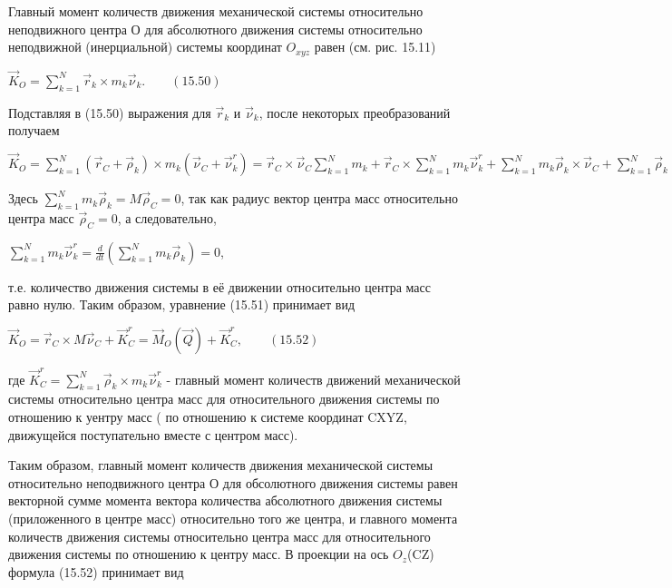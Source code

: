 {\begin{center}
	  \par Главный момент количеств движения механической системы относительно неподвижного центра О для абсолютного движения системы относительно неподвижной (инерциальной) системы координат $O_{xyz}$ равен (см. рис. 15.11)

	  \par $\vec K_O = \sum\limits_{k=1}^N \vec r_k \times m_k \vec\nu_k. \qquad (15.50)$

	  \par Подставляя в (15.50) выражения для $\vec r_k$ и $\vec\nu_k$, после некоторых преобразований получаем
	  
	  \par $\vec K_O = \sum\limits_{k=1}^N (\vec r_C + \vec\rho_k) \times m_k(\vec\nu_C + \vec\nu_k^r) = \vec r_C \times \vec\nu_C \sum\limits_{k=1}^N m_k + \vec r_C \times \sum\limits_{k=1}^N m_k \vec\nu_k^r + \sum\limits_{k=1}^N m_k \vec\rho_k \times \vec\nu_C + \sum\limits_{k=1}^N \vec\rho_k \times m_k \vec\nu_k^r. \qquad (15.51)$

	  \par Здесь $\sum\limits_{k=1}^N m_k \vec\rho_k = M \vec\rho_C = 0$, так как радиус вектор центра масс относительно центра масс $\vec\rho_C = 0$, а следовательно,

	  \par $\sum\limits_{k=1}^N m_k \vec\nu_k^r = \frac{d}{dt}(\sum\limits_{k=1}^N m_k \vec\rho_k) = 0$,

	  \par т.е. количество движения системы в её движении относительно центра масс равно нулю. Таким образом, уравнение (15.51) принимает вид

	  \par $\vec K_O = \vec r_C \times M \vec\nu_C + \vec K_C^r = \vec M_O(\vec Q) + \vec K_C^r, \qquad (15.52)$

	  \par где $\vec K_C^r = \sum\limits_{k=1}^N \vec\rho_k \times m_k \vec\nu_k^r$ - главный момент количеств движений механической системы относительно центра масс для относительного движения системы по отношению к уентру масс ( по отношению к системе координат CXYZ, движущейся поступательно  вместе с центром масс).
	  \par Таким образом, главный момент количеств движения механической системы относительно неподвижного центра О для обсолютного движения системы равен векторной сумме момента вектора количества абсолютного движения системы (приложенного в центре масс) относительно того же центра, и главного момента количеств движения системы относительно центра масс для относительного движения системы по отношению к центру масс. В проекции на ось $O_z$(CZ) формула (15.52) принимает вид
	  

\end{center}}
